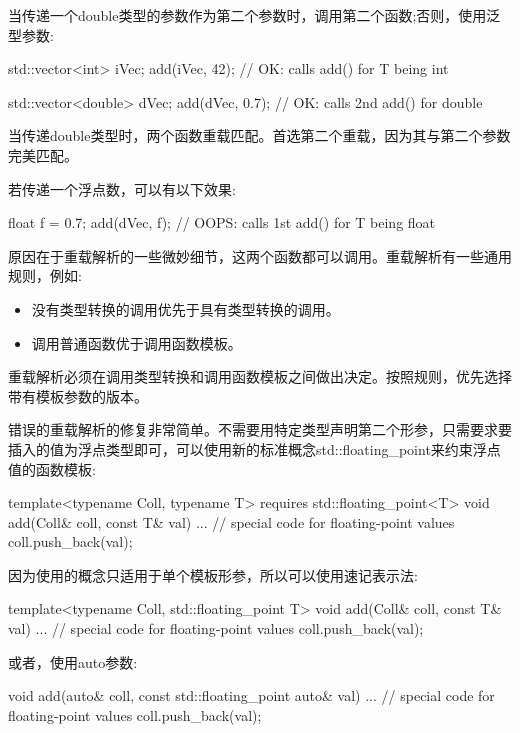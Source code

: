 当传递一个double类型的参数作为第二个参数时，调用第二个函数;否则，使用泛型参数:

\begin{cpp}
std::vector<int> iVec;
add(iVec, 42); // OK: calls add() for T being int

std::vector<double> dVec;
add(dVec, 0.7); // OK: calls 2nd add() for double
\end{cpp}

当传递double类型时，两个函数重载匹配。首选第二个重载，因为其与第二个参数完美匹配。

若传递一个浮点数，可以有以下效果:

\begin{cpp}
float f = 0.7;
add(dVec, f); // OOPS: calls 1st add() for T being float
\end{cpp}

原因在于重载解析的一些微妙细节，这两个函数都可以调用。重载解析有一些通用规则，例如:

\begin{itemize}
\item
没有类型转换的调用优先于具有类型转换的调用。

\item
调用普通函数优于调用函数模板。
\end{itemize}

重载解析必须在调用类型转换和调用函数模板之间做出决定。按照规则，优先选择带有模板参数的版本。


错误的重载解析的修复非常简单。不需要用特定类型声明第二个形参，只需要求要插入的值为浮点类型即可，可以使用新的标准概念std::floating\_point来约束浮点值的函数模板:

\begin{cpp}
template<typename Coll, typename T>
requires std::floating_point<T>
void add(Coll& coll, const T& val)
{
	... // special code for floating-point values
	coll.push_back(val);
}
\end{cpp}

因为使用的概念只适用于单个模板形参，所以可以使用速记表示法:

\begin{cpp}
template<typename Coll, std::floating_point T>
void add(Coll& coll, const T& val)
{
	... // special code for floating-point values
	coll.push_back(val);
}
\end{cpp}

或者，使用auto参数:

\begin{cpp}
void add(auto& coll, const std::floating_point auto& val)
{
	... // special code for floating-point values
	coll.push_back(val);
}
\end{cpp}

